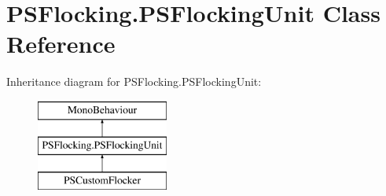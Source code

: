 \hypertarget{class_p_s_flocking_1_1_p_s_flocking_unit}{}\section{P\+S\+Flocking.\+P\+S\+Flocking\+Unit Class Reference}
\label{class_p_s_flocking_1_1_p_s_flocking_unit}
Inheritance diagram for P\+S\+Flocking.\+P\+S\+Flocking\+Unit\+:\begin{figure}[H]
\begin{center}
\leavevmode
\includegraphics[height=3.000000cm]{class_p_s_flocking_1_1_p_s_flocking_unit}
\end{center}
\end{figure}
